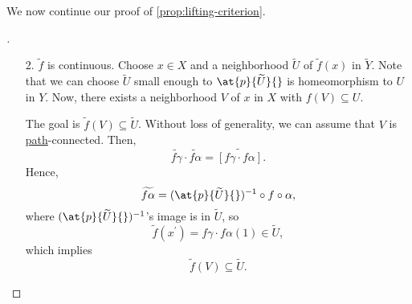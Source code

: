 We now continue our proof of \autoref{prop:lifting-criterion}.
\begin{proof}[\unskip\nopunct]
	\begin{enumerate}[(1)]
		\item[2.] \(\widetilde{f} \) is continuous. Choose \(x\in X\) and a neighborhood \(\widetilde{U} \) of
			\(\widetilde{f} (x)\) in \(\widetilde{Y} \). Note that we can choose \(\widetilde{U} \) small enough to \(\at{p}{\widetilde{U} }{} \) is homeomorphism
			to \(U\) in \(Y\). Now, there exists a neighborhood \(V\) of \(x\) in \(X\) with \(f(V)\subseteq U\).
			\begin{figure}[H]
				\centering
				\label{fig:pf:prop:lifting-criterion-2}
			\end{figure}
			The goal is \(\widetilde{f} (V)\subseteq \widetilde{U}\). Without loss of generality, we can assume that
			\(V\) is \hyperref[def:path]{path}-connected. Then,
			\[
				\widetilde{f \gamma } \cdot \widetilde{f \alpha } = \widetilde{\left[f \gamma \cdot f \alpha \right]}.
			\]
			Hence,
			\[
				\widetilde{f \alpha } = (\at{p}{\widetilde{U} }{})^{-1} \circ f\circ \alpha,
			\]
			where \((\at{p}{\widetilde{U} }{})^{-1}\)'s image is in \(\widetilde{U} \), so
			\[
				\widetilde{f} (x ^\prime ) = f \gamma \cdot f \alpha (1)\in \widetilde{U},
			\]
			which implies
			\[
				\widetilde{f} (V)\subseteq \widetilde{U}.
			\]
	\end{enumerate}
\end{proof}


